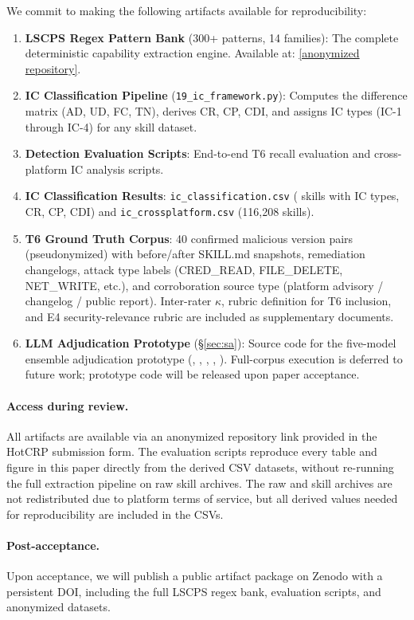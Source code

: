 
We commit to making the following artifacts available for reproducibility:

\begin{enumerate}[topsep=3pt,itemsep=2pt]
\item \textbf{LSCPS Regex Pattern Bank} (300+ patterns, 14 families):
  The complete deterministic capability extraction engine.
  Available at: \url{[anonymized repository]}.

\item \textbf{IC Classification Pipeline} (\texttt{19\_ic\_framework.py}):
  Computes the difference matrix (AD, UD, FC, TN), derives CR, CP, CDI,
  and assigns IC types (IC-1 through IC-4) for any skill dataset.

\item \textbf{Detection Evaluation Scripts}:
  End-to-end T6 recall evaluation and cross-platform
  IC analysis scripts.

\item \textbf{IC Classification Results}:
  \texttt{ic\_classification.csv} (\NskillsDMR{} \clawhub{} skills with IC types, CR, CP, CDI)
  and \texttt{ic\_crossplatform.csv} (116,208 \skillssh{} skills).

\item \textbf{T6 Ground Truth Corpus}:
  40 confirmed malicious version pairs (pseudonymized) with
  before/after SKILL.md snapshots, remediation changelogs,
  attack type labels (CRED\_READ, FILE\_DELETE, NET\_WRITE, etc.),
  and corroboration source type (platform advisory / changelog / public report).
  Inter-rater $\kappa$, rubric definition for T6 inclusion,
  and E4 security-relevance rubric are included as supplementary documents.

\item \textbf{LLM Adjudication Prototype} (\S\ref{sec:sa}):
  Source code for the five-model ensemble adjudication prototype
  (\mone, \mtwo, \mthree, \mfour, \mfive).
  Full-corpus execution is deferred to future work;
  prototype code will be released upon paper acceptance.

\end{enumerate}

\paragraph{Access during review.}
All artifacts are available via an anonymized repository link
provided in the HotCRP submission form.
The evaluation scripts reproduce every table and figure in this paper
directly from the derived CSV datasets, without re-running the full
extraction pipeline on raw skill archives.
The raw \clawhub{} and \skillssh{} skill archives are not redistributed
due to platform terms of service,
but all derived values needed for reproducibility are included in the CSVs.

\paragraph{Post-acceptance.}
Upon acceptance, we will publish a public artifact package on Zenodo
with a persistent DOI, including the full LSCPS regex bank,
evaluation scripts, and anonymized datasets.
